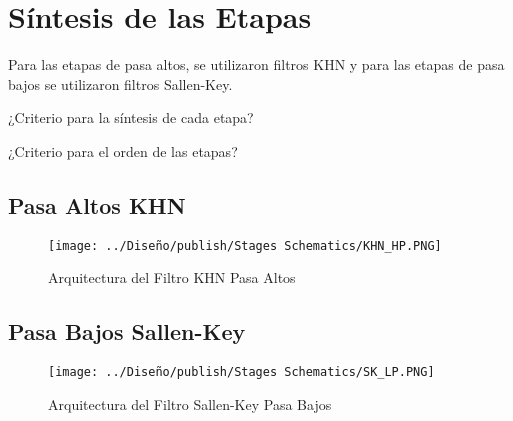 \chapter{Síntesis de las Etapas}

Para las etapas de pasa altos, se utilizaron filtros KHN y para las etapas de pasa bajos se utilizaron filtros Sallen-Key.

¿Criterio para la síntesis de cada etapa?

¿Criterio para el orden de las etapas?

\section{Pasa Altos KHN}

\begin{figure}[ht]
\begin{center}
\texttt{[image: ../Diseño/publish/Stages Schematics/KHN\_HP.PNG]}
\caption{Arquitectura del Filtro KHN Pasa Altos}
\end{center}
\end{figure}

\section{Pasa Bajos Sallen-Key}

\begin{figure}[ht]
\begin{center}
\texttt{[image: ../Diseño/publish/Stages Schematics/SK\_LP.PNG]}
\caption{Arquitectura del Filtro Sallen-Key Pasa Bajos}
\end{center}
\end{figure}